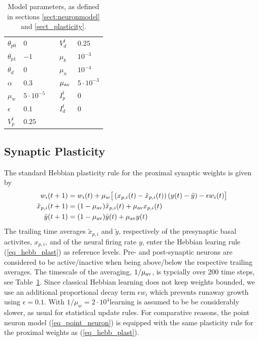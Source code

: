 \documentclass[utf8]{frontiersSCNS} %
\providecommand{\DIFaddtex}[1]{{\protect\color{blue}\uwave{#1}}} %
\providecommand{\DIFaddbegin}{} %
\providecommand{\DIFaddend}{} %
\providecommand{\DIFadd}[1]{\texorpdfstring{\DIFaddtex{#1}}{#1}} %
\begin{document}
\begin{table}[b]
\caption{Model parameters,
as defined in sections \ref{sect:neuronmodel} and
\ref{sect_plasticity}.}
\begin{tabular}{ l | l || l | l }
		$\theta_{p0}$ & $0$ & $V_d^t$ & $0.25$ \\
		$\theta_{p1}$ & $-1$ & $\mu_b$ & $10^{-3}$ \\ 
		$\theta_{d}$ & $0$ & $\mu_n$ & $10^{-4}$ \\  
		$\alpha$ & $0.3$ & $\mu_{\rm av}$ & $5 \cdot 10^{-3}$ \\   
		$\mu_w$ & $5 \cdot 10^{-5}\quad$ & $I_p^t$ & $0$ \\
		$\epsilon$ & $0.1$ & $I_d^t$ & $0$ \\
		$V_p^t$ & $0.25$ &  &
\end{tabular}
\label{tab_parameters}
\end{table}

\subsection{Synaptic Plasticity\label{sect_plasticity}}

The standard Hebbian plasticity rule for the 
proximal synaptic weights is given by
\begin{align}
w_i(t+1) &= w_i(t) + \mu_w 
\big[\left(x_{p,i}(t) - \tilde{x}_{p,i}(t)\right)
\left(y(t) - \tilde{y} \right) - \epsilon w_i(t) \big]
\label{eq_hebb_plast} \\
\tilde{x}_{p,i}(t+1) &= 
(1-\mu_{\rm av})\tilde{x}_{p,i}(t) + \mu_{\rm av}x_{p,i}(t) 
\label{eq_tilde_x_p_i}\\
\tilde{y}(t+1) &= (1-\mu_{\rm av})\tilde{y}(t) + \mu_{\rm av}y(t)
\label{eq_tilde_y}
\end{align}
The trailing time averages $\tilde{x}_{p,i}$ and
$\tilde{y}$, respectively of the presynaptic 
basal activites, $x_{p,i}$, and of the neural
firing rate $y$, enter the Hebbian learing
rule (\ref{eq_hebb_plast}) as reference levels.
Pre- and post-synaptic neurons are considered
to be active/inactive when being above/below
the respective trailing averages. The
timescale of the averaging, $1/\mu_{\rm av}$,
is typcially over 200 time steps, see
Table~\ref{tab_parameters}.
Since classical Hebbian learning does not keep
weights bounded, we use an additional proportional decay
term $\epsilon w_i$ which prevents runaway
growth using $\epsilon = 0.1$.
With $1/\mu_w=2\cdot10^4$\DIFaddbegin \DIFadd{, }\DIFaddend learning is 
assumed to be be considerably slower, 
as usual for statistical update rules.
For comparative reasons, the point neuron 
model (\ref{eq_point_neuron}) is equipped 
with the same plasticity rule for the proximal 
weights as (\ref{eq_hebb_plast}).
\end{document}
